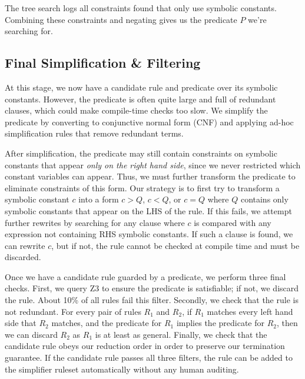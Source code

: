\documentclass[sigplan,10pt,review,anonymous]{acmart}\settopmatter{printfolios=true,printccs=false,printacmref=false}
\begin{document}
The tree search logs all constraints found that only use symbolic constants.  Combining
these constraints and negating gives us the predicate $P$ we're searching for.

\subsection{Final Simplification \& Filtering} At this stage, we now have a candidate
rule and predicate over its symbolic constants.  However, the predicate is often quite
large and full of redundant clauses, which could make compile-time checks too slow.
We simplify the predicate by converting to conjunctive normal form (CNF) and applying
ad-hoc simplification rules that remove redundant terms.

After simplification, the predicate may still contain constraints on symbolic constants
that appear \textit{only on the right hand side}, since we never restricted which constant
variables can appear.  Thus, we must further transform the predicate to eliminate
constraints of this form.  Our strategy is to first try to transform a symbolic constant
$c$ into a form $c > Q$, $c < Q$, or $c = Q$ where $Q$ contains only symbolic constants
that appear on the LHS of the rule.  If this fails, we attempt further rewrites by
searching for any clause where $c$ is compared with any expression not containing RHS
symbolic constants.  If such a clause is found, we can rewrite $c$, but if not, the rule
cannot be checked at compile time and must be discarded.

Once we have a candidate rule guarded by a predicate, we perform three final checks.
First, we query Z3 to ensure the
predicate is satisfiable; if not, we discard the rule.  About 10\% of all rules fail
this filter.  Secondly, we check that the rule is not redundant.  For every pair of
rules $R_1$ and $R_2$, if $R_1$ matches every left hand side that $R_2$ matches,
and the predicate for $R_1$ implies the predicate for $R_2$, then we can discard $R_2$
as $R_1$ is at least as general. Finally, we check that the candidate rule obeys our
reduction order in order to preserve our termination guarantee. If the candidate rule passes all three filters, the rule can be added to the simplifier ruleset automatically without any human auditing.
\end{document}
